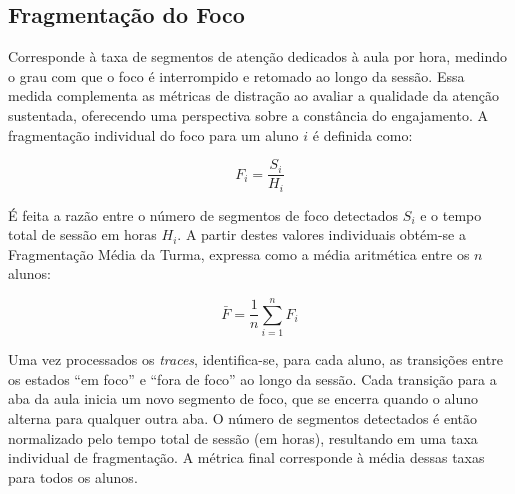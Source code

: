 \subsection{Fragmentação do Foco}
Corresponde à taxa de segmentos de atenção dedicados à aula por hora, medindo o grau com que o foco é interrompido e retomado ao longo da sessão. Essa medida complementa as métricas de distração ao avaliar a qualidade da atenção sustentada, oferecendo uma perspectiva sobre a constância do engajamento. A fragmentação individual do foco para um aluno $i$ é definida como:

\begin{equation}\label{eq:focus_fragmentation_student}
F_i = \frac{S_i}{H_i}
\end{equation}

É feita a razão entre o número de segmentos de foco detectados $S_i$ e o tempo total de sessão em horas $H_i$. A partir destes valores individuais obtém-se a Fragmentação Média da Turma, expressa como a média aritmética entre os $n$ alunos:

\begin{equation}\label{eq:focus_fragmentation_avg}
\bar{F} = \frac{1}{n} \sum_{i=1}^{n} F_i
\end{equation}

Uma vez processados os \textit{traces}, identifica-se, para cada aluno, as transições entre os estados “em foco” e “fora de foco” ao longo da sessão. Cada transição para a aba da aula inicia um novo segmento de foco, que se encerra quando o aluno alterna para qualquer outra aba. O número de segmentos detectados é então normalizado pelo tempo total de sessão (em horas), resultando em uma taxa individual de fragmentação. A métrica final corresponde à média dessas taxas para todos os alunos.


% 

